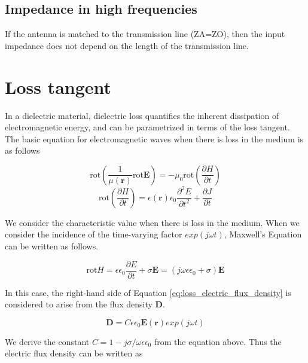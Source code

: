 \documentclass[a4paper,11pt]{jsarticle}
\begin{document}
\subsection{Impedance in high frequencies}

If the antenna is matched to the transmission line (ZA=ZO),
then the input impedance does not depend on the length of the transmission line.

\section{Loss tangent}

In a dielectric material, dielectric loss quantifies the inherent dissipation
of electromagnetic energy, and can be parametrized in terms of the loss tangent.
The basic equation for electromagnetic waves
when there is loss in the medium is as follows

\begin{equation}
  \mathrm{rot}(\frac{1}{\mu(\boldsymbol{r})}\mathrm{rot}\boldsymbol{E}) = -\mu_0 \mathrm{rot}(\frac{\partial H}{\partial t})
\end{equation}
\begin{equation}
  \mathrm{rot}(\frac{\partial H}{\partial t}) = \epsilon(\boldsymbol{r})\epsilon_0 \frac{\partial^2 E}{\partial t^2} + \frac{\partial J}{\partial t}
\end{equation}


We consider the characteristic value when there is loss in the medium.
When we consider the incidence of the time-varying factor $exp(j\omega t)$,
Maxwell's Equation can be written as follows.

\begin{equation} \label{eq:loss_electric_flux_density}
  \mathrm{rot} H = \epsilon \epsilon_0 \frac{\partial E}{\partial t} + \sigma \boldsymbol{E} = (j\omega\epsilon\epsilon_0 + \sigma)\boldsymbol{E}
\end{equation}

In this case, the right-hand side of Equation \ref{eq:loss_electric_flux_density}
is considered to arise from the flux density $\boldsymbol{D}$.

\begin{equation} \label{eq:electric_flux_density}
  \boldsymbol{D} = C\epsilon \epsilon_0 \boldsymbol{E}(\boldsymbol{r})exp(j\omega t)
\end{equation}

We derive the constant $C=1 - j\sigma / \omega\epsilon\epsilon_0$ from the equation above.
Thus the electric flux density can be written as
\end{document}
